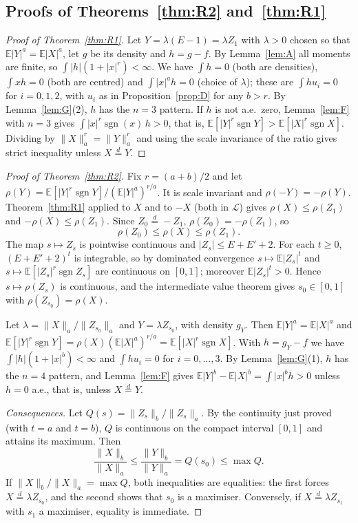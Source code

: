 \documentclass[11pt]{article}
\theoremstyle{remark}
\newcommand{\E}{\mathbb E}
\newcommand{\eqd}{\overset{d}{=}}
\begin{document}
\subsection{\texorpdfstring{Proofs of Theorems~\ref{thm:R2} and~\ref{thm:R1}}{Proofs of the reduction theorems}}

\begin{proof}[Proof of Theorem~\ref{thm:R1}]
Let $Y=\lambda(E-1)=\lambda Z_1$ with $\lambda>0$ chosen so that $\E|Y|^a=\E|X|^a$, let $g$ be its density and $h=g-f$. By Lemma~\ref{lem:A} all moments are finite, so $\int|h|(1+|x|^r)<\infty$. We have $\int h=0$ (both are densities), $\int xh=0$ (both are centred) and $\int|x|^ah=0$ (choice of $\lambda$); these are $\int hu_i=0$ for $i=0,1,2$, with $u_i$ as in Proposition~\ref{prop:D} for any $b>r$. By Lemma~\ref{lem:G}(2), $h$ has the $n=3$ pattern. If $h$ is not a.e.\ zero, Lemma~\ref{lem:F} with $n=3$ gives $\int|x|^r\operatorname{sgn}(x)\,h>0$, that is, $\E[|Y|^r\operatorname{sgn}Y]>\E[|X|^r\operatorname{sgn}X]$. Dividing by $\|X\|_a^r=\|Y\|_a^r$ and using the scale invariance of the ratio gives strict inequality unless $X\eqd Y$.
\end{proof}

\begin{proof}[Proof of Theorem~\ref{thm:R2}]
Fix $r=(a+b)/2$ and let $\rho(Y)=\E[|Y|^r\operatorname{sgn}Y]/(\E|Y|^a)^{r/a}$. It is scale invariant and $\rho(-Y)=-\rho(Y)$. Theorem~\ref{thm:R1} applied to $X$ and to $-X$ (both in $\mathcal L$) gives $\rho(X)\le\rho(Z_1)$ and $-\rho(X)\le\rho(Z_1)$. Since $Z_0\eqd-Z_1$, $\rho(Z_0)=-\rho(Z_1)$, so
\[
\rho(Z_0)\le\rho(X)\le\rho(Z_1).
\]
The map $s\mapsto Z_s$ is pointwise continuous and $|Z_s|\le E+E'+2$. For each $t\ge0$, $(E+E'+2)^t$ is integrable, so by dominated convergence $s\mapsto\E|Z_s|^t$ and $s\mapsto\E[|Z_s|^r\operatorname{sgn}Z_s]$ are continuous on $[0,1]$; moreover $\E|Z_s|^t>0$. Hence $s\mapsto\rho(Z_s)$ is continuous, and the intermediate value theorem gives $s_0\in[0,1]$ with $\rho(Z_{s_0})=\rho(X)$.

Let $\lambda=\|X\|_a/\|Z_{s_0}\|_a$ and $Y=\lambda Z_{s_0}$, with density $g_Y$. Then $\E|Y|^a=\E|X|^a$ and $\E[|Y|^r\operatorname{sgn}Y]=\rho(X)(\E|X|^a)^{r/a}=\E[|X|^r\operatorname{sgn}X]$. With $h=g_Y-f$ we have $\int|h|(1+|x|^b)<\infty$ and $\int hu_i=0$ for $i=0,\dots,3$. By Lemma~\ref{lem:G}(1), $h$ has the $n=4$ pattern, and Lemma~\ref{lem:F} gives $\E|Y|^b-\E|X|^b=\int|x|^bh>0$ unless $h=0$ a.e., that is, unless $X\eqd Y$.

\emph{Consequences.} Let $Q(s)=\|Z_s\|_b/\|Z_s\|_a$. By the continuity just proved (with $t=a$ and $t=b$), $Q$ is continuous on the compact interval $[0,1]$ and attains its maximum. Then
\[
\frac{\|X\|_b}{\|X\|_a}\le\frac{\|Y\|_b}{\|Y\|_a}=Q(s_0)\le\max Q.
\]
If $\|X\|_b/\|X\|_a=\max Q$, both inequalities are equalities: the first forces $X\eqd\lambda Z_{s_0}$, and the second shows that $s_0$ is a maximiser. Conversely, if $X\eqd\lambda Z_{s_1}$ with $s_1$ a maximiser, equality is immediate.
\end{proof}
\end{document}
